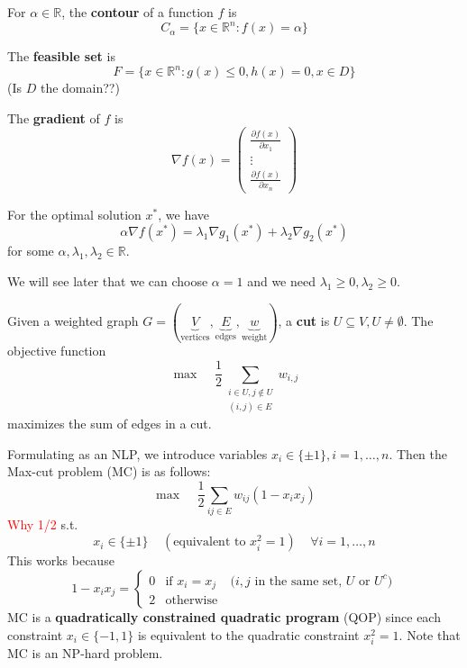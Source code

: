 \begin{definition}[Contour]
    For $\alpha \in \mathbb R$, the \textbf{contour} of a function $f$ is $$C_\alpha = \{ x \in \mathbb R^n: f(x) = \alpha\}$$
\end{definition}
\begin{definition}
    The \textbf{feasible set} is $$F = \{x \in \mathbb R^n: g(x) \leq 0, h(x) = 0, x \in D\}$$ (Is $D$ the domain??)
\end{definition}
\begin{definition}[Gradient]
    The \textbf{gradient} of $f$ is $$\nabla f(x) = 
    \begin{pmatrix} \frac{\partial f(x)}{\partial x_1} \\ \vdots \\ \frac{\partial f(x)}{\partial x_n}\end{pmatrix}$$

    For the optimal solution $x^*$, we have
    $$\alpha \nabla f(x^*) = \lambda_1 \nabla g_1(x^*) + \lambda_2 \nabla g_2(x^*)$$ for some $\alpha, \lambda_1, \lambda_2 \in \mathbb R$.

    We will see later that we can choose $\alpha = 1$ and we need $\lambda_1 \geq 0, \lambda_2 \geq 0$.
\end{definition}
\begin{Example}
    Given a weighted graph $G = (\underbrace{V}_{\text{vertices}}, \underbrace{E}_{\text{edges}}, \underbrace{w}_{\text{weight}})$, a \textbf{cut} is $U \subseteq V, U \neq \emptyset$. The objective function $$\max \;\;\;\; \frac{1}{2} \sum_{\substack{i \in U, j \not \in U \\ (i,j) \in E}} w_{i,j}$$ maximizes the sum of edges in a cut.

    Formulating as an NLP, we introduce variables $x_i \in \{\pm 1\}, i = 1,\ldots, n$. Then the Max-cut problem (MC) is as follows:
    $$\max\;\;\;\; \frac{1}{2} \sum_{ij \in E} w_{ij}(1 - x_ix_j)$$ \textcolor{red}{Why 1/2}
    s.t. $$x_i \in \{\pm 1\}  \;\;\;\;(\text{equivalent to } x^2_i = 1)\;\;\;\; \forall i = 1,\ldots, n$$
    This works because $$1 - x_ix_j = \begin{cases} 0 & \text{if }x_i = x_j \;\;\;\; \text{($i,j$ in the same set, $U$ or $U^c$)} \\
    2 & \text{otherwise}
    \end{cases}$$
    MC is a \textbf{quadratically constrained quadratic program} (QOP) since each constraint $x_i \in \{-1, 1\}$ is equivalent to the quadratic constraint $x^2_i = 1$. Note that MC is an NP-hard problem.
\end{Example}
